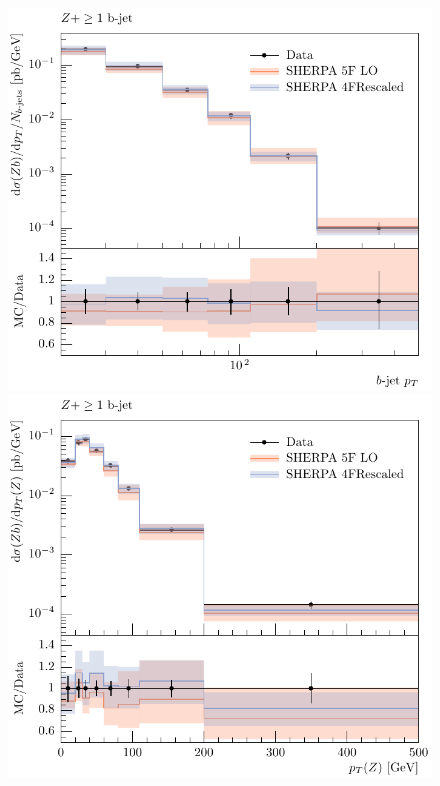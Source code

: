 \documentclass[11pt]{cernrep}
\begin{document}
\begin{figure}[htbp]
\begin{center}
   \includegraphics[scale=0.65]{figs/zbb/sherpa/d03-x01-y01_rescaled.pdf}
   \includegraphics[scale=0.65]{figs/zbb/sherpa/d15-x01-y01_rescaled.pdf} \\

\end{center}
\end{figure}
\end{document}
